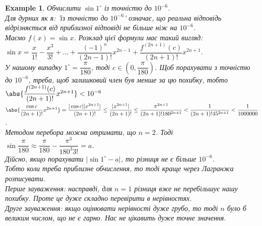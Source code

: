 \documentclass[a4paper, 14pt]{article}
\theoremstyle{theoremdd}
\theoremstyle{theoremdd}
\theoremstyle{theoremdd}
\theoremstyle{theoremdd}
\newtheorem{example}[theorem]{Example}
\theoremstyle{theoremdd}
\theoremstyle{theoremdd}
\theoremstyle{theoremdd}
\theoremstyle{theoremdd}
\begin{document}
\begin{example}
Обчислити $\sin 1^\circ$ із точністю до $10^{-6}$.\\
Для дурних як я: 'із точністю до $10^{-6}$' означає, що реальна відповідь відрізняється від приблизної відповіді не більше ніж на $10^{-6}$.\\
Маємо $f(x) = \sin x$. Розклад цієї формули має такий вигляд:\\
$\sin x = \dfrac{x}{1!} - \dfrac{x^3}{3!} + \dots + \dfrac{(-1)^n}{(2n-1)!}x^{2n-1} + \dfrac{f^{(2n+1)}(c)}{(2n+1)!} x^{2n+1}$.\\
У нашому випадку $1^{\circ} = \dfrac{\pi}{180}$, тоді $c \in \left( 0, \dfrac{\pi}{180} \right)$.
Щоб порахувати з точністю до $10^{-6}$, треба, щоб залишковий член був менше за цю похибку, тобто\\
$\abs{\dfrac{f^{(2n+1)}(c)}{(2n+1)!} x^{2n+1}} < 10^{-6}$\\
$\abs{\dfrac{\cos c}{(2n+1)!} x^{2n+1}} = \dfrac{|\cos c| |x^{2n+1}|}{(2n+1)!} \leq \dfrac{|x^{2n+1}|}{(2n+1)!} \leq \dfrac{\pi^{2n+1}}{(2n+1)! 180^{2n+1}} < \dfrac{1}{(2n+1)! 45^{2n+1}} < \dfrac{1}{1000000}$.\\
Методом перебора можна отримати, що $n = 2$. Тоді\\
$\sin \dfrac{\pi}{180} \approx \dfrac{\pi}{180} - \dfrac{\pi^3}{180^3 3!} = a$.\\
Дійсно, якщо порахувати $|\sin 1^{\circ} - a|$, то різниця не є більше $10^{-6}$.\\
\textit{Тобто коли треба приблизне обчислення, то тоді краще через Лагранжа розписувати.}
\bigskip \\
Перше зауваження: насправді, для $n=1$ різниця вже не перебільшує нашу похибку. Проте це дуже складно перевірити в нерівностях.\\
Друге зауваження: якщо оцінювати нерівності дуже грубо, то тоді $n$ було б великим числом, що не є гарно. Нас не цікавить дуже точне значення.
\end{example}


\newpage
\end{document}
